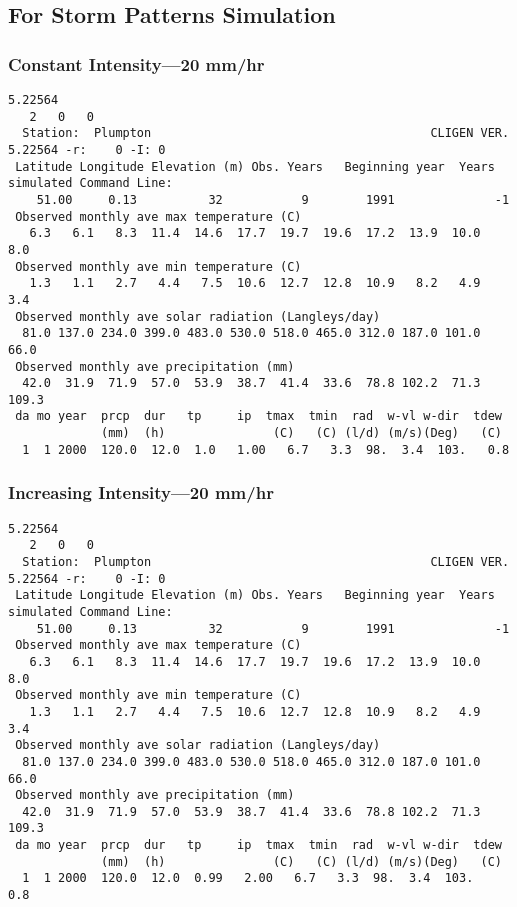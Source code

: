 \subsection{For Storm Patterns Simulation}
\label{sec:ForIntraStormPatternsSimulation}

\subsubsection{Constant Intensity---20 mm/hr}
\label{sec:ConstantIntensity20MmHr}

\begin{verbatim}
5.22564
   2   0   0
  Station:  Plumpton                                       CLIGEN VER. 5.22564 -r:    0 -I: 0
 Latitude Longitude Elevation (m) Obs. Years   Beginning year  Years simulated Command Line:
    51.00     0.13          32           9        1991              -1          
 Observed monthly ave max temperature (C)
   6.3   6.1   8.3  11.4  14.6  17.7  19.7  19.6  17.2  13.9  10.0   8.0
 Observed monthly ave min temperature (C)
   1.3   1.1   2.7   4.4   7.5  10.6  12.7  12.8  10.9   8.2   4.9   3.4
 Observed monthly ave solar radiation (Langleys/day)
  81.0 137.0 234.0 399.0 483.0 530.0 518.0 465.0 312.0 187.0 101.0  66.0
 Observed monthly ave precipitation (mm)
  42.0  31.9  71.9  57.0  53.9  38.7  41.4  33.6  78.8 102.2  71.3 109.3
 da mo year  prcp  dur   tp     ip  tmax  tmin  rad  w-vl w-dir  tdew
             (mm)  (h)               (C)   (C) (l/d) (m/s)(Deg)   (C)
  1  1 2000  120.0  12.0  1.0   1.00   6.7   3.3  98.  3.4  103.   0.8
\end{verbatim}

\subsubsection{Increasing Intensity---20 mm/hr}
\label{sec:IncreasingIntensity20MmHr}

\begin{verbatim}
5.22564
   2   0   0
  Station:  Plumpton                                       CLIGEN VER. 5.22564 -r:    0 -I: 0
 Latitude Longitude Elevation (m) Obs. Years   Beginning year  Years simulated Command Line:
    51.00     0.13          32           9        1991              -1          
 Observed monthly ave max temperature (C)
   6.3   6.1   8.3  11.4  14.6  17.7  19.7  19.6  17.2  13.9  10.0   8.0
 Observed monthly ave min temperature (C)
   1.3   1.1   2.7   4.4   7.5  10.6  12.7  12.8  10.9   8.2   4.9   3.4
 Observed monthly ave solar radiation (Langleys/day)
  81.0 137.0 234.0 399.0 483.0 530.0 518.0 465.0 312.0 187.0 101.0  66.0
 Observed monthly ave precipitation (mm)
  42.0  31.9  71.9  57.0  53.9  38.7  41.4  33.6  78.8 102.2  71.3 109.3
 da mo year  prcp  dur   tp     ip  tmax  tmin  rad  w-vl w-dir  tdew
             (mm)  (h)               (C)   (C) (l/d) (m/s)(Deg)   (C)
  1  1 2000  120.0  12.0  0.99   2.00   6.7   3.3  98.  3.4  103.   0.8
\end{verbatim}

